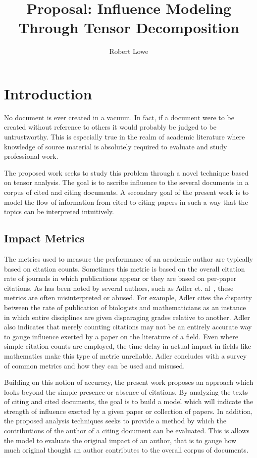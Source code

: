 \documentclass{article}
\title{Proposal: Influence Modeling Through Tensor Decomposition}
\author{Robert Lowe}
\begin{document}
\maketitle

\section{Introduction}
No document is ever created in a vacuum.  In fact, if a document were
to be created without reference to others it would probably be judged
to be untrustworthy.  This is especially true in the realm of
academic literature where knowledge of source material is absolutely
required to evaluate and study professional work. 

The proposed work seeks to study this problem through
a novel technique based on tensor analysis.  The goal is to ascribe
influence to the several documents in a corpus of cited and citing
documents. A secondary goal of the present work is to model the flow
of information from cited to citing papers in such a way that the
topics can be interpreted intuitively.

\subsection{Impact Metrics}
The metrics used to measure the performance of an academic author are
typically based on citation counts.  Sometimes this metric is based on
the overall citation rate of journals in which publications appear or
they are based on per-paper citations.  As has been noted by several
authors, such as Adler et. al~\cite{adler2009}, these metrics are
often misinterpreted or abused.  For example, Adler cites the
disparity between the rate of publication of biologists and
mathematicians as an instance in which entire disciplines are given
disparaging grades relative to another. Adler also indicates that
merely counting citations may not be an entirely accurate way to gauge
influence exerted by a paper on the literature of a field.  Even where
simple citation counts are employed, the time-delay in actual impact
in fields like mathematics make this type of metric unreliable.  Adler
concludes with a survey of common metrics and how they can be used and
misused.

Building on this notion of accuracy, the present work proposes an
approach which looks beyond the simple presence or absence of
citations.  By analyzing the texts of citing and cited documents, the
goal is to build a model which will indicate the strength of influence
exerted by a given paper or collection of papers.  In addition, the
proposed analysis techniques seeks to provide a method by which the
contributions of the author of a citing document can be evaluated.
This is allows the model to evaluate the original impact of an author,
that is to gauge how much original thought an author contributes to
the overall corpus of documents. 
\end{document}

